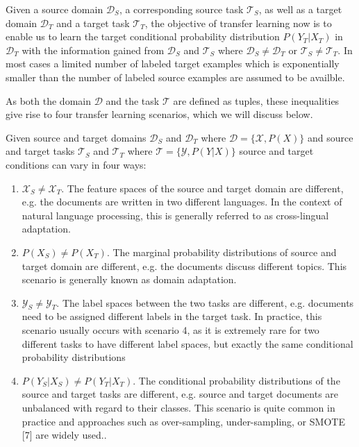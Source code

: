 Given a source domain $\mathcal{D}_S$, a corresponding source task $\mathcal{T}_S$, as well as a target domain $\mathcal{D}_T$ and a target task $\mathcal{T}_T$, the objective of transfer learning now is to enable us to learn the target conditional probability distribution $P(Y_T|X_T)$ in $\mathcal{D}_T$ with the information gained from $\mathcal{D}_S$ and $\mathcal{T}_S$ where $\mathcal{D}_S \neq \mathcal{D}_T$ or $\mathcal{T}_S \neq \mathcal{T}_T$. In most cases a limited number of labeled target examples which is exponentially smaller than the number of labeled source examples are assumed to be availble.

As both the domain $\mathcal{D}$ and the task $\mathcal{T}$ are defined as tuples, these inequalities give rise to four transfer learning scenarios, which we will discuss below.

Given source and target domains $\mathcal{D}_S$ and $\mathcal{D}_T$ where $\mathcal{D} = \{\mathcal{X},P(X)\}$ and source and target tasks $\mathcal{T}_S$ and $\mathcal{T}_T$ where $\mathcal{T} = \{\mathcal{Y}, P(Y|X)\}$ source and target conditions can vary in four ways:

\begin{enumerate}
    \item $\mathcal{X}_S \neq \mathcal{X}_T$. The feature spaces of the source and target domain are different, e.g. the documents are written in two different languages. In the context of natural language processing, this is generally referred to as cross-lingual adaptation.
    \item $P(X_S) \neq P(X_T)$. The marginal probability distributions of source and target domain are different, e.g. the documents discuss different topics. This scenario is generally known as domain adaptation.
    \item $\mathcal{Y}_S \neq \mathcal{Y}_T$. The label spaces between the two tasks are different, e.g. documents need to be assigned different labels in the target task. In practice, this scenario usually occurs with scenario 4, as it is extremely rare for two different tasks to have different label spaces, but exactly the same conditional probability distributions
    \item $P(Y_S|X_S) \neq P(Y_T|X_T)$. The conditional probability distributions of the source and target tasks are different, e.g. source and target documents are unbalanced with regard to their classes. This scenario is quite common in practice and approaches such as over-sampling, under-sampling, or SMOTE [7] are widely used..
\end{enumerate}

